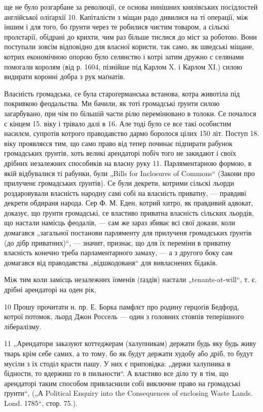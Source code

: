 ще не було розгарбане за революції, се основа нинішних
князівських посідлостей англійської оліґархії 10. Капіталісти
з міщан радо дивилися на ті операції, між їншим і для
того, бо ґрунти через те робилися чистим товаром, а сільскі
пролєтарії, обідрані до крихти, чим раз більше тислися
до міст за роботою. Вони поступали зовсім відповідно для
власної користи, так само, як шведські міщане, котрих економічною
опорою було селянство і котрі затим дружно с селянами
помогали королям (від р. 1604, пізнійше під Карлом
X. і Карлом XI.) силою видирати коронні добра з рук
маґнатів.

Власність громадська, се була староґерманська встанова,
котра животіла під покривкою феодальства. Ми бачили,
як тоті громадські ґрунти силою загарбувано, при
чім по більшій части рілю перемінювано в толоки. Се почалося
с кінцем 15. віку і трівало далі в 16. Але тоді було
се все такі особистим насилєм, супротів котрого праводавство
дармо боролося цілих 150 літ. Поступ 18. віку проявляєся
тим, що само право від тепер починає підпирати рабунок
громадських ґрунтів, хоть великі арендаторі побіч
того не закидают і своїх дрібних незалежних способиків на
власну руку 11.  Парляментарною формою, в якій відбувалися
ті рабунки, були „Bills for Inclosures of Commons“ (Закони
про прилученє громадських ґрунтів). Се були декрети, котрими
сільскі льорди роздаровували власність народну самі
собі на власність приватну, — правдиві декрети обдираня
народа. Сер Ф. М. Еден, котрий хитро, як правдивий адвокат,
доказує, що ґрунти громадські, се властиво приватна
власність сільских льордів, що настали намісць феодалів,
— сам же зараз збиває всі свої докази, коли домагався
„загальної постанови парляменту для прилученя громадських
ґрунтів (до дібр приватних)“, — значит, признає, що
для їх переміни в приватну власність конечно треба парламентарного
замаху, — а з другого боку сам домагався
від праводавства „відшкодованя“ для вивласнених бідаків.

Між тим коли замісць незалежних їоменів (ґаздів) настали
„tenants-at-will“, т. є. дрібні арендаторі на оден рік,

10   Прошу прочитати н. пр. Е. Борка памфлєт про родину герцоґів
Бедфорд, котрої потомок, льорд Джон Россель — один з головних стовпів
теперішного лібералізму.

11 „Арендатори заказуют коттеджерам (халупникам) держати будь
яку будь живу тварь крім себе самих, а то тому, бо як будут держати
худобу або дріб, то будут мусіли з їх стоділ красти пашу. У них є приповідка:
„держи халупника в бідности, то вдержиш го в пильности“.
А властиво все діло ту в тім, що арендаторі таким способом привласнили
собі виключне право на громадські ґрунти“, („А Political Enquiry into
the Consequences of enclosing Waste Lands. Lond. 1785“, стор. 75.).

